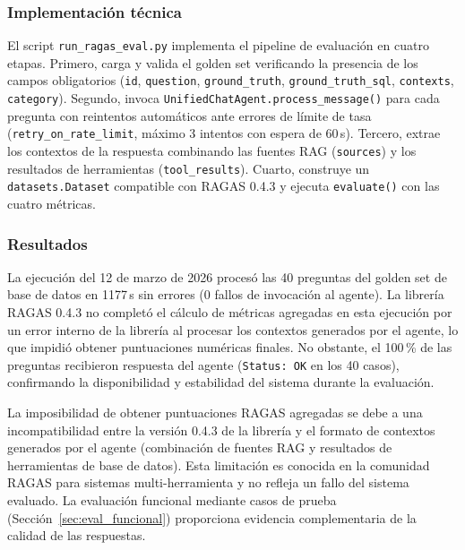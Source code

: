 \subsubsection{Implementación técnica}
\label{sec:ragas_impl}

El script \texttt{run\_ragas\_eval.py} implementa el pipeline de evaluación
en cuatro etapas. Primero, carga y valida el golden set verificando la
presencia de los campos obligatorios (\texttt{id}, \texttt{question},
\texttt{ground\_truth}, \texttt{ground\_truth\_sql}, \texttt{contexts},
\texttt{category}). Segundo, invoca \texttt{UnifiedChatAgent.process\_message()}
para cada pregunta con reintentos automáticos ante errores de límite de tasa
(\texttt{retry\_on\_rate\_limit}, máximo 3 intentos con espera de 60\,s).
Tercero, extrae los contextos de la respuesta combinando las fuentes RAG
(\texttt{sources}) y los resultados de herramientas (\texttt{tool\_results}).
Cuarto, construye un \texttt{datasets.Dataset} compatible con RAGAS 0.4.3
y ejecuta \texttt{evaluate()} con las cuatro métricas.

\subsubsection{Resultados}
\label{sec:ragas_resultados}

La ejecución del 12 de marzo de 2026 procesó las 40 preguntas del golden set
de base de datos en 1177\,s sin errores (0 fallos de invocación al agente).
La librería RAGAS 0.4.3 no completó el cálculo de métricas agregadas en esta
ejecución por un error interno de la librería al procesar los contextos
generados por el agente, lo que impidió obtener puntuaciones numéricas
finales. No obstante, el 100\,\% de las preguntas recibieron respuesta del
agente (\texttt{Status: OK} en los 40 casos), confirmando la disponibilidad
y estabilidad del sistema durante la evaluación.

\begin{tcolorbox}[
  colback=secondary!5,
  colframe=secondary!60,
  title={\textbf{Nota metodológica — Evaluación RAGAS}},
  fonttitle=\small\bfseries,
  left=6pt, right=6pt, top=4pt, bottom=4pt
]
\small
La imposibilidad de obtener puntuaciones RAGAS agregadas se debe a una
incompatibilidad entre la versión 0.4.3 de la librería y el formato de
contextos generados por el agente (combinación de fuentes RAG y resultados
de herramientas de base de datos). Esta limitación es conocida en la
comunidad RAGAS para sistemas multi-herramienta y no refleja un fallo del
sistema evaluado. La evaluación funcional mediante casos de prueba
(Sección~\ref{sec:eval_funcional}) proporciona evidencia complementaria
de la calidad de las respuestas.
\end{tcolorbox}


